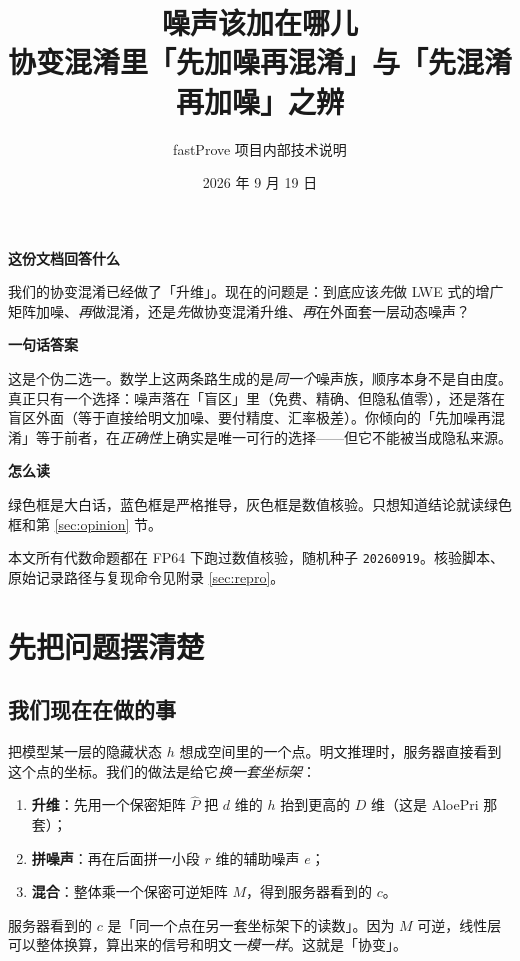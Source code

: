 \documentclass[UTF8, fontset=macnew, 11pt]{ctexart}
\title{\bfseries 噪声该加在哪儿\\[4pt]
\large 协变混淆里「先加噪再混淆」与「先混淆再加噪」之辨}
\author{fastProve 项目内部技术说明}
\date{2026 年 9 月 19 日}
\newcommand{\Ph}{\hat P}
\begin{document}
\maketitle

\begin{tcolorbox}[enhanced, colback=white, colframe=black!55, boxrule=0.5pt,
  left=10pt, right=10pt, top=8pt, bottom=8pt]
\textbf{这份文档回答什么}

我们的协变混淆已经做了「升维」。现在的问题是：到底应该\emph{先}做 LWE 式的增广矩阵加噪、\emph{再}做混淆，还是\emph{先}做协变混淆升维、\emph{再}在外面套一层动态噪声？

\textbf{一句话答案}

这是个伪二选一。数学上这两条路生成的是\emph{同一个}噪声族，顺序本身不是自由度。真正只有一个选择：噪声落在「盲区」里（免费、精确、但隐私值零），还是落在盲区外面（等于直接给明文加噪、要付精度、汇率极差）。你倾向的「先加噪再混淆」等于前者，在\emph{正确性}上确实是唯一可行的选择——但它不能被当成隐私来源。

\textbf{怎么读}

绿色框是大白话，蓝色框是严格推导，灰色框是数值核验。只想知道结论就读绿色框和第 \ref{sec:opinion} 节。
\end{tcolorbox}

\vspace{4pt}
{\small 本文所有代数命题都在 FP64 下跑过数值核验，随机种子 \texttt{20260919}。核验脚本、原始记录路径与复现命令见附录 \ref{sec:repro}。\par}

\tableofcontents

\section{先把问题摆清楚}

\subsection{我们现在在做的事}

\begin{plainbox}
把模型某一层的隐藏状态 $h$ 想成空间里的一个点。明文推理时，服务器直接看到这个点的坐标。我们的做法是给它\emph{换一套坐标架}：

\begin{enumerate}[label=(\arabic*)]
  \item \textbf{升维}：先用一个保密矩阵 $\Ph$ 把 $d$ 维的 $h$ 抬到更高的 $D$ 维（这是 AloePri 那套）；
  \item \textbf{拼噪声}：再在后面拼一小段 $r$ 维的辅助噪声 $e$；
  \item \textbf{混合}：整体乘一个保密可逆矩阵 $M$，得到服务器看到的 $c$。
\end{enumerate}

服务器看到的 $c$ 是「同一个点在另一套坐标架下的读数」。因为 $M$ 可逆，线性层可以整体换算，算出来的信号和明文\emph{一模一样}。这就是「协变」。
\end{plainbox}
\end{document}
